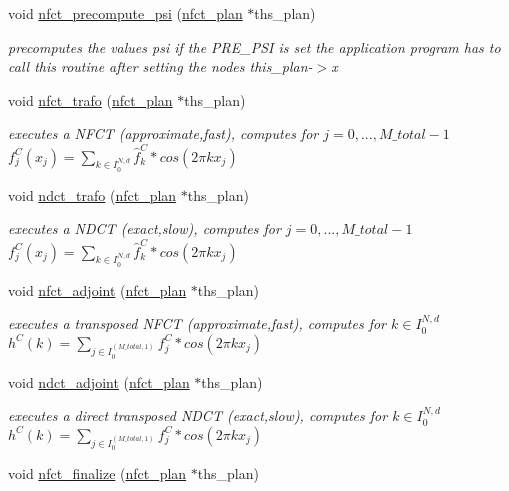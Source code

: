 \begin{CompactItemize}
void \hyperlink{group__nfsct_ga5}{nfct\_\-precompute\_\-psi} (\hyperlink{structnfct__plan}{nfct\_\-plan} $\ast$ths\_\-plan)
\begin{CompactList}\small\item\em precomputes the values psi if the PRE\_\-PSI is set the application program has to call this routine after setting the nodes this\_\-plan-$>$x \item\end{CompactList}\item 
void \hyperlink{group__nfsct_ga6}{nfct\_\-trafo} (\hyperlink{structnfct__plan}{nfct\_\-plan} $\ast$ths\_\-plan)
\begin{CompactList}\small\item\em executes a NFCT (approximate,fast), computes for $j=0,...,M\_total-1$ $f_j^C(x_j) = \sum_{k \in I_0^{N,d}} \hat{f}_k^C * cos(2 \pi k x_j)$ \item\end{CompactList}\item 
void \hyperlink{group__nfsct_ga7}{ndct\_\-trafo} (\hyperlink{structnfct__plan}{nfct\_\-plan} $\ast$ths\_\-plan)
\begin{CompactList}\small\item\em executes a NDCT (exact,slow), computes for $j=0,...,M\_total-1$ $f_j^C(x_j) = \sum_{k \in I_0^{N,d}} \hat{f}_k^C * cos(2 \pi k x_j)$ \item\end{CompactList}\item 
void \hyperlink{group__nfsct_ga8}{nfct\_\-adjoint} (\hyperlink{structnfct__plan}{nfct\_\-plan} $\ast$ths\_\-plan)
\begin{CompactList}\small\item\em executes a transposed NFCT (approximate,fast), computes for $k \in I_0^{N,d}$ $h^C(k) = \sum_{j \in I_0^{(M\_total,1)}} f_j^C * cos(2 \pi k x_j)$ \item\end{CompactList}\item 
void \hyperlink{group__nfsct_ga9}{ndct\_\-adjoint} (\hyperlink{structnfct__plan}{nfct\_\-plan} $\ast$ths\_\-plan)
\begin{CompactList}\small\item\em executes a direct transposed NDCT (exact,slow), computes for $k \in I_0^{N,d}$ $h^C(k) = \sum_{j \in I_0^{(M\_total,1)}} f_j^C * cos(2 \pi k x_j)$ \item\end{CompactList}\item 
void \hyperlink{group__nfsct_ga10}{nfct\_\-finalize} (\hyperlink{structnfct__plan}{nfct\_\-plan} $\ast$ths\_\-plan)

\end{CompactItemize}

